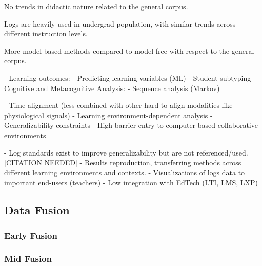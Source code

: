 \documentclass[manuscript,screen,review]{acmart}
\begin{document}
No trends in didactic nature related to the general corpus.

Logs are heavily used in undergrad population, with similar trends across different instruction levels.

More model-based methods compared to model-free with respect to the general corpus.

- Learning outcomes:
    - Predicting learning variables (ML)
    - Student subtyping
- Cognitive and Metacognitive Analysis:
    - Sequence analysis (Markov)

- Time alignment (less combined with other hard-to-align modalities like physiological signals)
- Learning environment-dependent analysis
- Generalizability constraints
- High barrier entry to computer-based collaborative environments

- Log standards exist to improve generalizability but are not referenced/used. [CITATION NEEDED]
- Results reproduction, transferring methods across different learning environments and contexts.
- Visualizations of logs data to important end-users (teachers)
- Low integration with EdTech (LTI, LMS, LXP)

\subsection{Data Fusion}


\subsubsection{Early Fusion}

\subsubsection{Mid Fusion}
\end{document}

